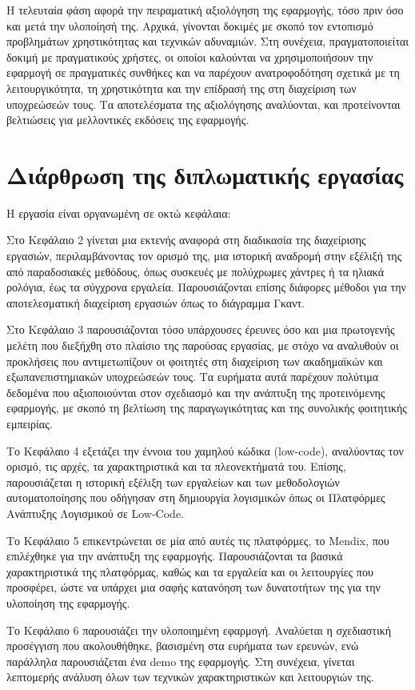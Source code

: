 		Η τελευταία φάση αφορά την πειραματική αξιολόγηση της εφαρμογής, τόσο πριν όσο και μετά την υλοποίησή της. Αρχικά, γίνονται δοκιμές με σκοπό τον εντοπισμό προβλημάτων χρηστικότητας και τεχνικών αδυναμιών. Στη συνέχεια, πραγματοποιείται δοκιμή με πραγματικούς χρήστες, οι οποίοι καλούνται να χρησιμοποιήσουν την εφαρμογή σε πραγματικές συνθήκες και να παρέχουν ανατροφοδότηση σχετικά με τη λειτουργικότητα, τη χρηστικότητα και την επίδρασή της στη διαχείριση των υποχρεώσεών τους. Τα αποτελέσματα της αξιολόγησης αναλύονται, και προτείνονται βελτιώσεις για μελλοντικές εκδόσεις της εφαρμογής.


	\section{Διάρθρωση της διπλωματικής εργασίας}
		Η εργασία είναι οργανωμένη σε οκτώ κεφάλαια:

		Στο Κεφάλαιο 2 γίνεται μια εκτενής αναφορά στη διαδικασία της διαχείρισης εργασιών, περιλαμβάνοντας τον ορισμό της, μια ιστορική αναδρομή στην εξέλιξή της από παραδοσιακές μεθόδους, όπως συσκευές με πολύχρωμες χάντρες ή τα ηλιακά ρολόγια, έως τα σύγχρονα εργαλεία. Παρουσιάζονται επίσης διάφορες μέθοδοι για την αποτελεσματική διαχείριση εργασιών όπως το διάγραμμα Γκαντ.

		Στο Κεφάλαιο 3 παρουσιάζονται τόσο υπάρχουσες έρευνες όσο και μια πρωτογενής μελέτη που διεξήχθη στο πλαίσιο της παρούσας εργασίας, με στόχο να αναλυθούν οι προκλήσεις που αντιμετωπίζουν οι φοιτητές στη διαχείριση των ακαδημαϊκών και εξωπανεπιστημιακών υποχρεώσεών τους. Τα ευρήματα αυτά παρέχουν πολύτιμα δεδομένα που αξιοποιούνται στον σχεδιασμό και την ανάπτυξη της προτεινόμενης εφαρμογής, με σκοπό τη βελτίωση της παραγωγικότητας και της συνολικής φοιτητικής εμπειρίας.

		Το Κεφάλαιο 4 εξετάζει την έννοια του χαμηλού κώδικα (low-code), αναλύοντας τον ορισμό, τις αρχές, τα χαρακτηριστικά και τα πλεονεκτήματά του. Επίσης, παρουσιάζεται η ιστορική εξέλιξη των εργαλείων και των μεθοδολογιών αυτοματοποίησης που οδήγησαν στη δημιουργία λογισμικών όπως οι Πλατφόρμες Ανάπτυξης Λογισμικού σε Low-Code.

		Το Κεφάλαιο 5 επικεντρώνεται σε μία από αυτές τις πλατφόρμες, το Mendix, που επιλέχθηκε για την ανάπτυξη της εφαρμογής. Παρουσιάζονται τα βασικά χαρακτηριστικά της πλατφόρμας, καθώς και τα εργαλεία και οι λειτουργίες που προσφέρει, ώστε να υπάρχει μια σαφής κατανόηση των δυνατοτήτων της για την υλοποίηση της εφαρμογής.

		Το Κεφάλαιο 6 παρουσιάζει την υλοποιημένη εφαρμογή. Αναλύεται η σχεδιαστική προσέγγιση που ακολουθήθηκε, βασισμένη στα ευρήματα των ερευνών, ενώ παράλληλα παρουσιάζεται ένα demo της εφαρμογής. Στη συνέχεια, γίνεται λεπτομερής ανάλυση όλων των τεχνικών χαρακτηριστικών και λειτουργιών της.

